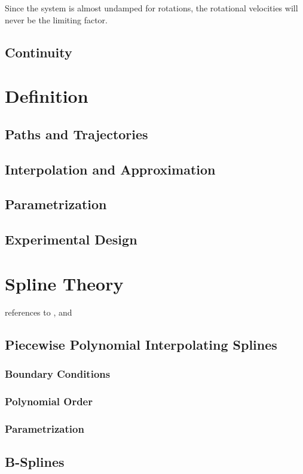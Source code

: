 Since the system is almost undamped for rotations, the rotational velocities will never be the limiting factor.





\subsection{Continuity}


\section{Definition}
\subsection{Paths and Trajectories}
\subsection{Interpolation and Approximation}
\subsection{Parametrization}
\subsection{Experimental Design}

\section{Spline Theory}
references to \cite{engeln}, \cite{biagiotti} and \cite{doessegger}
\subsection{Piecewise Polynomial Interpolating Splines}
\subsubsection{Boundary Conditions}
\subsubsection{Polynomial Order}
\subsubsection{Parametrization}
\subsection{B-Splines}
